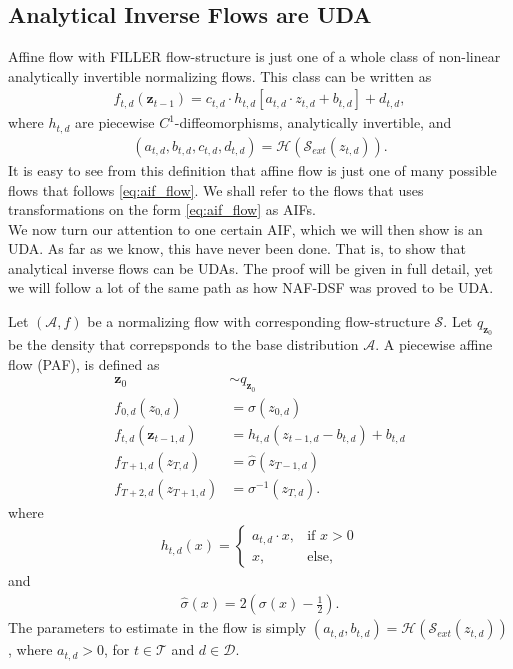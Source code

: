 \subsection{Analytical Inverse Flows are UDA}
Affine flow with FILLER flow-structure is just one of a whole class of non-linear analytically invertible normalizing flows. 
This class can be written as 
\begin{align}\label{eq:aif_flow}
    f_{t, d}(\bm z_{t-1}) = c_{t,d} \cdot h_{t,d}[a_{t,d} \cdot z_{t,d} 
    + b_{t,d}] + d_{t,d},
\end{align}
where \(h_{t,d}\) are piecewise \(C^1\)-diffeomorphisms, analytically invertible, and 
\begin{align*}
    (a_{t,d}, b_{t,d}, c_{t,d}, d_{t,d}) = \mathcal{H}(\mathcal{S}_{ext}(z_{t,d})).
\end{align*}
It is easy to see from this definition
that affine flow is just one of many possible flows that follows \cref{eq:aif_flow}. We shall refer to the flows
that uses transformations on the form \cref{eq:aif_flow} as AIFs.\\

We now turn our attention to one certain AIF, which we will then show is an UDA. As far as we know, this have never been done. That is,
to show that analytical inverse flows can be UDAs. The proof will be given in full detail, yet we will follow a lot of the same path as
how NAF-DSF was proved to be UDA.
\begin{definition}
    Let \((\mathcal{A}, f)\) be a normalizing flow with corresponding flow-structure \(\mathcal{S}\). Let \(q_{\bm z_0}\) be
    the density that correpsponds to the base distribution \(\mathcal{A}\). A piecewise affine flow (PAF), is defined as
    \begin{align}
        \bm z_0 &\sim q_{\bm z_0} \\
        f_{0,d}(z_{0,d}) &= \sigma(z_{0,d})\\
        f_{t,d}(\bm z_{t-1,d}) &= h_{t,d}(z_{t-1,d} - b_{t,d}) + b_{t,d} \label{eq:h_trans}\\
        f_{T+1,d}(z_{T,d}) &= \hat{\sigma}(z_{T-1,d})\\
        f_{T+2,d}(z_{T+1,d}) &= \sigma^{-1}(z_{T,d}).
    \end{align}
    where
    \begin{align}
        h_{t,d}(x) = 
        \begin{cases}
            a_{t,d}\cdot x, & \text{if \(x > 0\)} \\
            x,& \text{else},
        \end{cases}
    \end{align}
    and 
    \begin{align}
        \hat{\sigma}(x) = 2\left(\sigma(x) - \frac{1}{2}\right).
    \end{align}
    The parameters to estimate in the flow is simply \((a_{t,d}, b_{t,d}) = \mathcal{H}(\mathcal{S}_{ext}(z_{t,d}))\),
    where \(a_{t,d} > 0\), for \(t\in \mathcal{T}\) and \(d \in \mathcal{D}\).
\end{definition}

